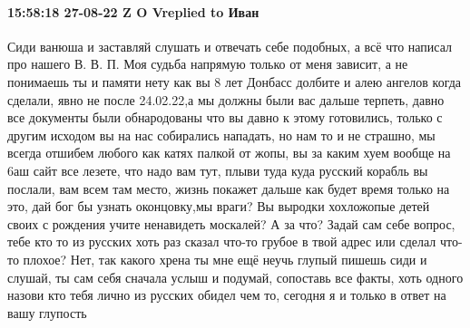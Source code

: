  
 
 
 
 

\paragraph{15:58:18 27-08-22 Z O Vreplied to Иван}

Сиди ванюша и заставляй слушать и отвечать себе подобных, а всё что написал про
нашего В. В. П. Моя судьба напрямую только от меня зависит, а не понимаешь ты и
памяти нету как вы 8 лет Донбасс долбите и алею ангелов когда сделали, явно не
после 24.02.22,а мы должны были вас дальше терпеть, давно все документы были
обнародованы что вы давно к этому готовились, только с другим исходом вы на нас
собирались нападать, но нам то и не страшно, мы всегда отшибем любого как катях
палкой от жопы, вы за каким хуем вообще на 6аш сайт все лезете, что надо вам
тут, плыви туда куда русский корабль вы послали, вам всем там место, жизнь
покажет дальше как будет время только на это, дай бог бы узнать оконцовку,мы
враги? Вы выродки хохложопые детей своих с рождения учите ненавидеть москалей?
А за что? Задай сам себе вопрос, тебе кто то из русских хоть раз сказал что-то
грубое в твой адрес или сделал что-то плохое? Нет, так какого хрена ты мне ещё
неучь глупый пишешь сиди и слушай, ты сам себя сначала услыш и подумай,
сопоставь все факты, хоть одного назови кто тебя лично из русских обидел чем
то, сегодня я и только в ответ на вашу глупость
